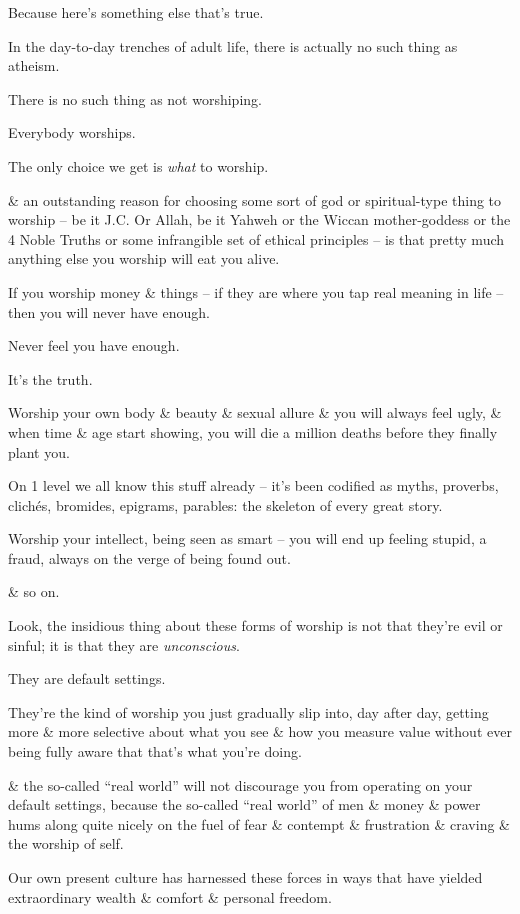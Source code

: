 \documentclass{article}
\begin{document}
Because here's something else that's true.

In the day-to-day trenches of adult life, there is actually no such thing as atheism.

There is no such thing as not worshiping.

Everybody worships.

The only choice we get is {\it what} to worship.

\& an outstanding reason for choosing some sort of god or spiritual-type thing to worship -- be it J.C. Or Allah, be it Yahweh or the Wiccan mother-goddess or the 4 Noble Truths or some infrangible set of ethical principles -- is that pretty much anything else you worship will eat you alive.

If you worship money \& things -- if they are where you tap real meaning in life -- then you will never have enough.

Never feel you have enough.

It's the truth.

Worship your own body \& beauty \& sexual allure \& you will always feel ugly, \& when time \& age start showing, you will die a million deaths before they finally plant you.

On 1 level we all know this stuff already -- it's been codified as myths, proverbs, clich\'es, bromides, epigrams, parables: the skeleton of every great story.

Worship your intellect, being seen as smart -- you will end up feeling stupid, a fraud, always on the verge of being found out.

\& so on.

Look, the insidious thing about these forms of worship is not that they're evil or sinful; it is that they are {\it unconscious}.

They are default settings.

They're the kind of worship you just gradually slip into, day after day, getting more \& more selective about what you see \& how you measure value without ever being fully aware that that's what you're doing.

\& the so-called ``real world'' will not discourage you from operating on your default settings, because the so-called ``real world'' of men \& money \& power hums along quite nicely on the fuel of fear \& contempt \& frustration \& craving \& the worship of self.

Our own present culture has harnessed these forces in ways that have yielded extraordinary wealth \& comfort \& personal freedom.
\end{document}
